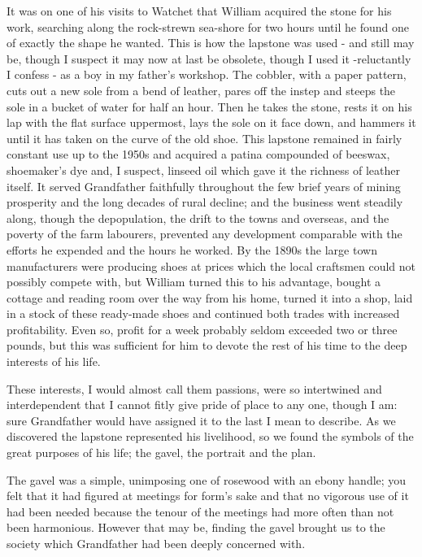 It was on one of his visits to Watchet that William acquired the stone for his work, searching along the rock-strewn sea-shore for two hours until he found one of exactly the shape he wanted. This is how the lapstone was used - and still may be, though I suspect it may now at last be obsolete, though I used it -reluctantly I confess - as a boy in my father's workshop. The cobbler, with a paper pattern, cuts out a new sole from a bend of leather, pares off the instep and steeps the sole in a bucket of water for half an hour. Then he takes the stone, rests it on his lap with the flat surface uppermost, lays the sole on it face down, and hammers it until it has taken on the curve of the old shoe. This lapstone remained in fairly constant use up to the 1950s and acquired a patina compounded of beeswax, shoemaker's dye and, I suspect, linseed oil which gave it the richness of leather itself. It served Grandfather faithfully throughout the few brief years of mining prosperity and the long decades of rural decline; and the business went steadily along, though the depopulation, the drift to the towns and overseas, and the poverty of the farm labourers, prevented any development comparable with the efforts he expended and the hours he worked. By the 1890s the large town manufacturers were producing shoes at prices which the local craftsmen could not possibly compete with, but William turned this to his advantage, bought a cottage and reading room over the way from his home, turned it into a shop, laid in a stock of these ready-made shoes and continued both trades with increased profitability. Even so, profit for a week probably seldom exceeded two or three pounds, but this was sufficient for him to devote the rest of his time to the deep interests of his life.

These interests, I would almost call them passions, were so intertwined and interdependent that I cannot fitly give pride of place to any one, though I am: sure Grandfather would have assigned it to the last I mean to describe. As we discovered the lapstone represented his livelihood, so we found the symbols of the great purposes of his life; the gavel, the portrait and the plan.

The gavel was a simple, unimposing one of rosewood with an ebony handle; you felt that it had figured at meetings for form's sake and that no vigorous use of it had been needed because the tenour of the meetings had more often than not been harmonious. However that may be, finding the gavel brought us to the society which Grandfather had been deeply concerned with.

